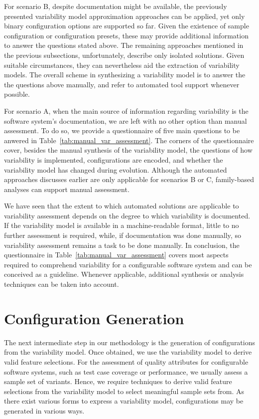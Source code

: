 For scenario B, despite documentation might be available, the
previously presented variability model approximation approaches
\citep{haslinger_reverse_2011,haslinger_extracting_2013,lopez-herrejon_reverse_2012,linsbauer_feature_2014}
can be applied, yet only binary configuration options are supported so far.
Given the existence of sample configuration or configuration presets, these
may provide additional information to answer the questions stated above. 
The remaining approaches mentioned in the previous subsections, unfortunately,
describe only isolated solutions. Given suitable circumstances, they can
nevertheless aid the extraction of variability models. The overall scheme in
synthesizing a variability model is to answer the the questions above manually,
and refer to automated tool support whenever possible.

For scenario A, when the main source of information regarding variability is
the software system's documentation, we are left with no other option than manual
assessment. To do so, we provide a questionnaire of
five main questions to be anwered in Table~\ref{tab:manual_var_assessment}.
The corners of the questionnaire cover, besides the manual synthesis of the
variability model, the questions of how variability is implemented,
configurations are encoded, and whether the variability model has changed
during evolution. Although the automated approaches discusses earlier are only
applicable for scenarios B or C, family-based analyses can support manual
assessment.

We have seen that the extent to which automated solutions are applicable to
variability assessment depends on the degree to which variability is
documented. If the variability model is available  in a machine-readable
format, little to no further assessment is required, while, if documentation was
done manually, so variability assessment remains a task to be done manually. 
In conclusion, the questionnaire in Table~\ref{tab:manual_var_assessment} covers
most aspects required to comprehend variability for a configurable software system and can be
conceived as a guideline. Whenever applicable, additional synthesis or analysis
techniques can be taken into account.

\section{Configuration Generation}\label{sec:configuration_gen}
The next intermediate step in our methodology is the generation of
configurations from the variability model. Once obtained, we use the
variability model to derive valid feature selections. For the assessment of
quality attributes for configurable software systems, such as test case
coverage or performance, we usually assess a sample set of variants. Hence, we
require techniques to derive valid feature selections from the variability
model to select meaningful sample sets from. As there exist various forms to
express a variability model, configurations may be generated in various ways.

